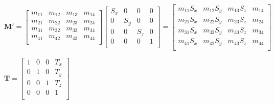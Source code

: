 \documentclass[12pt]{article}
\begin{document}
\vspace{4ex}


$
\boldsymbol{M'}=
\begin{bmatrix} 
m_{11} & m_{12} & m_{13} & m_{14} \\ 
m_{21} & m_{22} & m_{23} & m_{24} \\ 
m_{31} & m_{32} & m_{33} & m_{34} \\ 
m_{41} & m_{42} & m_{43} & m_{44} \\ 
\end{bmatrix}
\begin{bmatrix} 
S_x & 0 & 0 & 0 \\ 
0 & S_y & 0 & 0 \\ 
0 & 0 & S_z & 0 \\ 
0 & 0 & 0 & 1 \\ 
\end{bmatrix}
=
\begin{bmatrix} 
m_{11}S_x & m_{12}S_y & m_{13}S_z & m_{14} \\ 
m_{21}S_x & m_{22}S_y & m_{23}S_z & m_{24} \\ 
m_{31}S_x & m_{32}S_y & m_{33}S_z & m_{34} \\ 
m_{41}S_x & m_{42}S_y & m_{43}S_z & m_{44} \\ 
\end{bmatrix}
$

\vspace{4ex}

$
\boldsymbol{T}=
\begin{bmatrix} 
1 & 0 & 0 & T_x \\ 
0 & 1 & 0 & T_y \\ 
0 & 0 & 1 & T_z \\ 
0 & 0 & 0 & 1 \\ 
\end{bmatrix}
$

\vspace{4ex}
\end{document}
